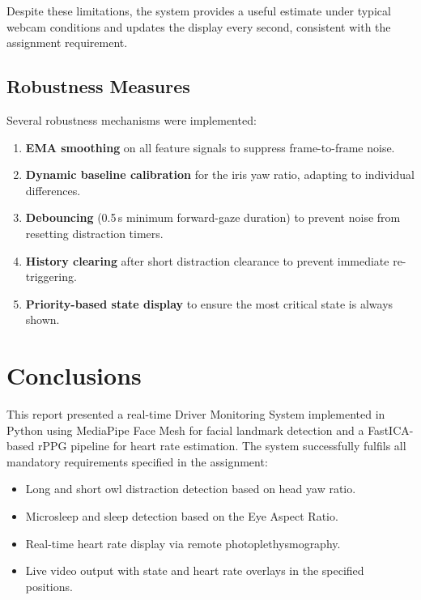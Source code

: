 \documentclass[12pt,a4paper]{article}
\begin{document}
Despite these limitations, the system provides a useful estimate under typical webcam conditions and updates the display every second, consistent with the assignment requirement.

\subsection{Robustness Measures}

Several robustness mechanisms were implemented:

\begin{enumerate}[noitemsep]
    \item \textbf{EMA smoothing} on all feature signals to suppress frame-to-frame noise.
    \item \textbf{Dynamic baseline calibration} for the iris yaw ratio, adapting to individual differences.
    \item \textbf{Debouncing} (0.5\,s minimum forward-gaze duration) to prevent noise from resetting distraction timers.
    \item \textbf{History clearing} after short distraction clearance to prevent immediate re-triggering.
    \item \textbf{Priority-based state display} to ensure the most critical state is always shown.
\end{enumerate}

\section{Conclusions}\label{sec:conclusions}

This report presented a real-time Driver Monitoring System implemented in Python using MediaPipe Face Mesh for facial landmark detection and a FastICA-based rPPG pipeline for heart rate estimation. The system successfully fulfils all mandatory requirements specified in the assignment:

\begin{itemize}[noitemsep]
    \item Long and short owl distraction detection based on head yaw ratio.
    \item Microsleep and sleep detection based on the Eye Aspect Ratio.
    \item Real-time heart rate display via remote photoplethysmography.
    \item Live video output with state and heart rate overlays in the specified positions.
\end{itemize}
\end{document}
